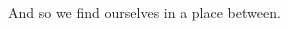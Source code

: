 \begin{paracol}{2}
  \begin{leftcolumn}

\null
\vfill
\noindent And so we find ourselves in a place between.
\vfill
\newpage

\end{leftcolumn}
\end{paracol}
